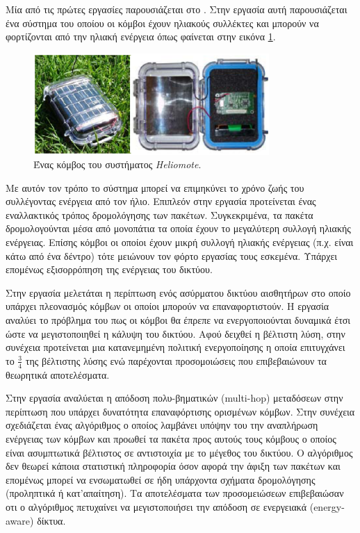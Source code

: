 Μία από τις πρώτες εργασίες παρουσιάζεται στο \cite{heliomote}. Στην εργασία αυτή παρουσιάζεται ένα σύστημα του οποίου οι κόμβοι έχουν ηλιακούς συλλέκτες
και μπορούν να φορτίζονται από την ηλιακή ενέργεια όπως φαίνεται στην εικόνα \ref{fig:heliomote_example}.
\begin{figure}[h]
	\centering
	\includegraphics[width=0.8\textwidth]{images/heliomote_example.eps}
	\caption{Ένας κόμβος του συστήματος \textit{Heliomote}.}
	\label{fig:heliomote_example}
\end{figure}

Με αυτόν τον τρόπο το σύστημα μπορεί να επιμηκύνει το χρόνο ζωής του συλλέγοντας ενέργεια από τον ήλιο. Επιπλεόν στην εργασία προτείνεται ένας εναλλακτικός τρόπος
δρομολόγησης των πακέτων. Συγκεκριμένα, τα πακέτα δρομολογούνται μέσα από μονοπάτια τα οποία έχουν το μεγαλύτερη συλλογή ηλιακής ενέργειας. Επίσης κόμβοι οι οποίοι
έχουν μικρή συλλογή ηλιακής ενέργειας (π.χ. είναι κάτω από ένα δέντρο) τότε μειώνουν τον φόρτο εργασίας τους εσκεμένα. Υπάρχει επομένως εξισορρόπηση της ενέργειας
του δικτύου.

Στην εργασία \cite{harvesting_6} μελετάται η περίπτωση ενός ασύρματου δικτύου αισθητήρων στο οποίο υπάρχει πλεονασμός κόμβων οι οποίοι μπορούν να
επαναφορτιστούν. Η εργασία αναλύει το πρόβλημα του πως οι κόμβοι θα έπρεπε να ενεργοποιούνται δυναμικά έτσι ώστε να μεγιστοποιηθεί η κάλυψη του δικτύου. Αφού δειχθεί
η βέλτιστη λύση, στην συνέχεια προτείνεται μια κατανεμημένη πολιτική ενεργοποίησης η οποία επιτυγχάνει το $\frac{3}{4}$ της βέλτιστης λύσης ενώ παρέχονται
προσομοιώσεις που επιβεβαιώνουν τα θεωρητικά αποτελέσματα.

Στην εργασία \cite{harvesting_7} αναλύεται η απόδοση πολυ-βηματικών (multi-hop) μεταδόσεων στην περίπτωση που υπάρχει δυνατότητα επαναφόρτισης ορισμένων κόμβων. Στην
συνέχεια σχεδιάζεται ένας αλγόριθμος ο οποίος λαμβάνει υπόψην του την αναπλήρωση ενέργειας των κόμβων και προωθεί τα πακέτα προς αυτούς τους κόμβους ο οποίος είναι
ασυμπτωτικά βέλτιστος σε αντιστοιχία με το μέγεθος του δικτύου. Ο αλγόριθμος δεν θεωρεί κάποια στατιστική πληροφορία όσον αφορά την άφιξη των πακέτων και επομένως
μπορεί να ενσωματωθεί σε ήδη υπάρχοντα σχήματα δρομολόγησης (προληπτικά ή κατ'απαίτηση). Τα αποτελέσματα των προσομειώσεων επιβεβαιώσαν οτι ο αλγόριθμος πετυχαίνει
να μεγιστοποιήσει την απόδοση σε ενεργειακά (energy-aware) δίκτυα.

